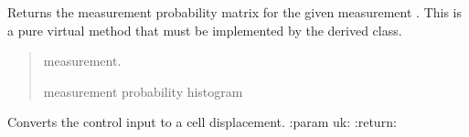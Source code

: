 \documentclass[letterpaper,10pt,english]{sphinxmanual}
\begin{document}
\begin{fulllineitems}
\begin{fulllineitems}
\begin{quote}
\begin{description}
\end{description}\end{quote}

\end{fulllineitems}


\begin{fulllineitems}
\label{\detokenize{HF:HF.HF.MeasurementProbability}}
\pysigstartsignatures
{}
\pysigstopsignatures
\sphinxAtStartPar
Returns the measurement probability matrix for the given measurement .
This is a pure virtual method that must be implemented by the derived class.
\begin{quote}\begin{description}
\sphinxAtStartPar
{} \textendash{} measurement.

\sphinxAtStartPar
{} measurement probability histogram

\end{description}\end{quote}

\end{fulllineitems}


\begin{fulllineitems}
\label{\detokenize{HF:HF.HF.uk2cell}}
\pysigstartsignatures
{}
\pysigstopsignatures
\sphinxAtStartPar
Converts the control input  to a cell displacement.
:param uk:
:return:

\end{fulllineitems}



\end{fulllineitems}
\end{document}
